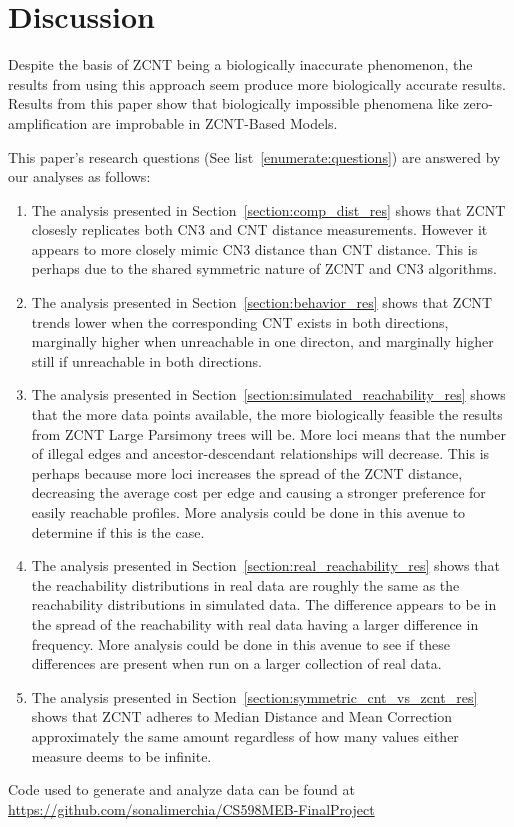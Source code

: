 \section{Discussion}

Despite the basis of ZCNT being a biologically inaccurate phenomenon, the results from using this approach seem produce more biologically accurate results. Results from this paper show that biologically impossible phenomena like zero-amplification are improbable in ZCNT-Based Models. 

This paper's research questions (See list~\ref{enumerate:questions}) are answered by our analyses as follows:

\begin{enumerate}
    \item The analysis presented in Section~\ref{section:comp_dist_res} shows that ZCNT closesly replicates both CN3 and CNT distance measurements. However it appears to more closely mimic CN3 distance than CNT distance. This is perhaps due to the shared symmetric nature of ZCNT and CN3 algorithms. 
    \item The analysis presented in Section~\ref{section:behavior_res} shows that ZCNT trends lower when the corresponding CNT exists in both directions, marginally higher when unreachable in one directon, and marginally higher still if unreachable in both directions. 
    \item The analysis presented in Section~\ref{section:simulated_reachability_res} shows that the more data points available, the more biologically feasible the results from ZCNT Large Parsimony trees will be. More loci means that the number of illegal edges and ancestor-descendant relationships will decrease. This is perhaps because more loci increases the spread of the ZCNT distance, decreasing the average cost per edge and causing a stronger preference for easily reachable profiles. More analysis could be done in this avenue to determine if this is the case. 
    \item The analysis presented in Section~\ref{section:real_reachability_res} shows that the reachability distributions in real data are roughly the same as the reachability distributions in simulated data. The difference appears to be in the spread of the reachability with real data having a larger difference in frequency. More analysis could be done in this avenue to see if these differences are present when run on a larger collection of real data. 
    \item The analysis presented in Section~\ref{section:symmetric_cnt_vs_zcnt_res} shows that ZCNT adheres to Median Distance and Mean Correction approximately the same amount regardless of how many values either measure deems to be infinite. 
\end{enumerate}

Code used to generate and analyze data can be found at \href{https://github.com/sonalimerchia/CS598MEB-FinalProject}{https://github.com/sonalimerchia/CS598MEB-FinalProject}

